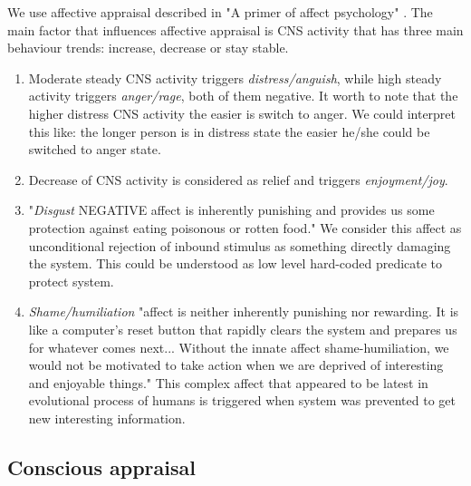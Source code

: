 We use affective appraisal described in "A primer of affect psychology" \cite{primer_affect_psychology}. The main factor that influences affective appraisal is CNS activity that has three main behaviour trends: increase, decrease or stay stable.

\begin{enumerate}
\item Moderate steady CNS activity triggers \emph{distress/anguish}, while high steady activity triggers \emph{anger/rage}, both of them negative.
It worth to note that the higher distress CNS activity the easier is switch to anger. We could interpret this like: the longer person is in distress state the easier he/she could be switched to anger state.

\item Decrease of CNS activity is considered as relief and triggers \emph{enjoyment/joy}.

\item "\emph{Disgust} NEGATIVE affect is inherently punishing and provides us some protection against eating poisonous or rotten food." We consider this affect as unconditional rejection of inbound stimulus as something directly damaging the system. This could be understood as low level hard-coded predicate to protect system.

\item \emph{Shame/humiliation} "affect is neither inherently punishing nor rewarding. It is like a computer's reset button that rapidly clears the system and prepares us for whatever comes next... Without the innate affect shame-humiliation, we would not be motivated to take action when we are deprived of interesting and enjoyable things." This complex affect that appeared to be latest in evolutional process of humans is triggered when system was prevented to get new interesting information.
\end{enumerate}

\subsection{Conscious appraisal}

